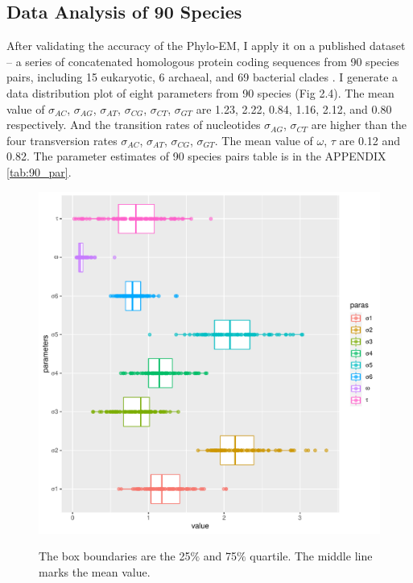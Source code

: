 \subsection{Data Analysis of 90 Species}
After validating the accuracy of the Phylo-EM, I apply it on a published dataset -- a series of concatenated homologous protein coding sequences from 90 species pairs, including 15 eukaryotic, 6 archaeal, and 69 bacterial clades \parencite{zou2021nonsynonymous}. I generate a data distribution plot of eight parameters from 90 species (Fig 2.4). The mean value of $\sigma_{AC}$, $\sigma_{AG}$, $\sigma_{AT}$,  $\sigma_{CG}$, $\sigma_{CT}$, $\sigma_{GT}$ are 1.23, 2.22, 0.84, 1.16, 2.12, and 0.80 respectively. And the transition rates of nucleotides $\sigma_{AG}$, $\sigma_{CT}$ are higher than the four transversion rates $\sigma_{AC}$, $\sigma_{AT}$,  $\sigma_{CG}$, $\sigma_{GT}$. The mean value of $\omega$, $\tau$ are 0.12 and 0.82. The parameter estimates of 90 species pairs table is in the APPENDIX \ref{tab:90_par}. 
\begin{figure}[H]
     \begin{minipage}[t]{1\textwidth }
     \centering
     \includegraphics[width=\linewidth]{Fig4.pdf}
     {{The box boundaries are the 25$\%$ and 75$\%$ quartile. The middle line marks the mean value.}
       \par}
     \end{minipage}
\end{figure}


